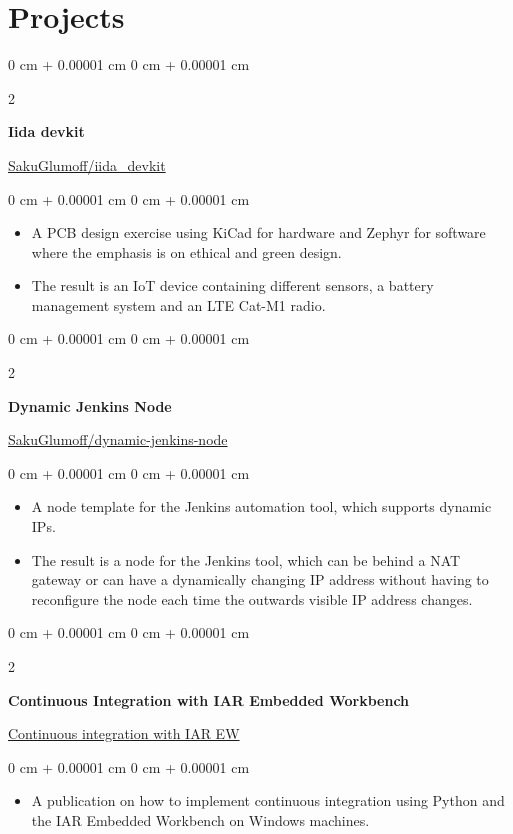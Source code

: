 \documentclass{article}
\newenvironment{highlights}{
    \begin{itemize}[
        topsep=0.10 cm,
        parsep=0.10 cm,
        partopsep=0pt,
        itemsep=0pt,
        leftmargin=0 cm + 10pt
    ]
}{
    \end{itemize}
}
\newenvironment{onecolentry}{
    \begin{adjustwidth}{
        0 cm + 0.00001 cm
    }{
        0 cm + 0.00001 cm
    }
}{
    \end{adjustwidth}
}
\newenvironment{twocolentry}[2][]{
    \onecolentry
    \def\secondColumn{#2}
    \setcolumnwidth{\fill, 4.5 cm}
    \begin{paracol}{2}
}{
    \switchcolumn \raggedleft \secondColumn
    \end{paracol}
    \endonecolentry
}
\begin{document}
  \section{Projects}
    \begin{twocolentry}{
      \href{https://github.com/SakuGlumoff/iida_devkit}{ SakuGlumoff/iida\_devkit}
    }
      \textbf{Iida devkit}
    \end{twocolentry}
    \vspace{0.1 cm}
    \begin{onecolentry}
      \begin{highlights}
        \item A PCB design exercise using KiCad for hardware and Zephyr for software where the emphasis is on ethical and green design.
        \item The result is an IoT device containing different sensors, a battery management system and an LTE Cat-M1 radio.
      \end{highlights}
    \end{onecolentry}
    \vspace{0.3 cm}
    \begin{twocolentry}{
      \href{https://github.com/SakuGlumoff/dynamic-jenkins-node}{\faIcon{github} SakuGlumoff/dynamic-jenkins-node}
    }
      \textbf{Dynamic Jenkins Node}
    \end{twocolentry}
    \vspace{0.1 cm}
    \begin{onecolentry}
      \begin{highlights}
        \item A node template for the Jenkins automation tool, which supports dynamic IPs.
        \item The result is a node for the Jenkins tool, which can be behind a NAT gateway or can have a dynamically changing IP address without having to reconfigure the node each time the outwards visible IP address changes.
      \end{highlights}
    \end{onecolentry}
    \vspace{0.3 cm}
    \begin{twocolentry}{
      \href{https://sakuglumoff.github.io/2019/10/18/Continuous-Integration-with-IAR-EW/}{\faIcon{github} Continuous integration with IAR EW}
    }
      \textbf{Continuous Integration with IAR Embedded Workbench}
    \end{twocolentry}
    \vspace{0.1 cm}
    \begin{onecolentry}
      \begin{highlights}
        \item A publication on how to implement continuous integration using Python and the IAR Embedded Workbench on Windows machines.
      \end{highlights}
    \end{onecolentry}
    \vspace{0.3 cm}
\end{document}
